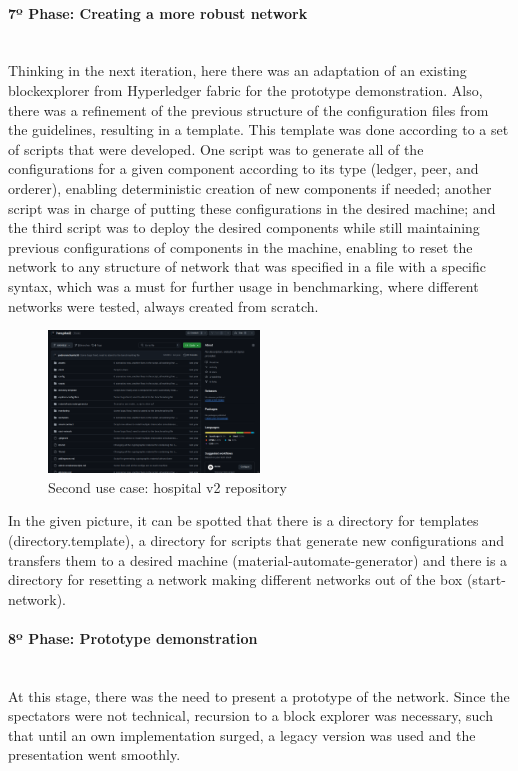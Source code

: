 \paragraph{7º Phase: Creating a more robust network}\mbox{}\\
Thinking in the next iteration, here there was an adaptation of an existing blockexplorer from Hyperledger fabric for the prototype demonstration. Also, there was a refinement of the previous structure of the configuration files from the guidelines, resulting in a template. This template was done according to a set of scripts that were developed. One script was to generate all of the configurations for a given component according to its type (ledger, peer, and orderer), enabling deterministic creation of new components if needed; another script was in charge of putting these configurations in the desired machine; and the third script was to deploy the desired components while still maintaining previous configurations of components in the machine, enabling to reset the network to any structure of network that was specified in a file with a specific syntax, which was a must for further usage in benchmarking, where different networks were tested, always created from scratch.
\begin{figure}[H]
    \centering
    \includegraphics[width=0.5\textwidth]{assets/use-case-2/robust-network-creation.png} %
    \caption{Second use case: hospital v2 repository}
    \label{fig:sample-image} 
\end{figure}
In the given picture, it can be spotted that there is a directory for templates (directory.template), a directory for scripts that generate new configurations  and transfers them to a desired machine (material-automate-generator) and there is a directory for resetting a network making different networks out of the box (start-network).

\paragraph{8º Phase: Prototype demonstration}\mbox{}\\
At this stage, there was the need to present a prototype of the network. Since the spectators were not technical, recursion to a block explorer was necessary, such that until an own implementation surged, a legacy version was used and the presentation went smoothly.

